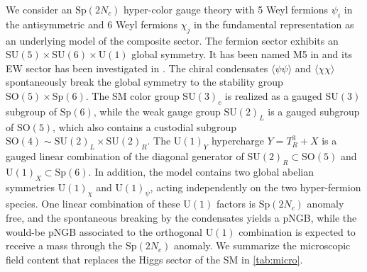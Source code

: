 \documentclass[preprintnumbers,nofootinbib,showpacs,eqsecnum,pre,12pt]{revtex4-1}
\newcommand{\SO}{\text{SO}}
\newcommand{\SU}{\text{SU}}
\newcommand{\U}{\text{U}}
\newcommand{\Sp}{\text{Sp}}
\begin{document}
We consider an $\Sp(2N_c)$ hyper-color gauge theory with 5 Weyl fermions $\psi_i$ in the antisymmetric and 6 Weyl fermions $\chi_j$ in the fundamental representation as an underlying model of the composite sector. The fermion sector exhibits an $\SU(5)\times \SU(6) \times \U(1)$ global symmetry. It has been named M5 in \cite{Belyaev:2016ftv}
and its EW sector has been investigated in \cite{Agugliaro:2018vsu}.
The chiral condensates $\langle \psi\psi \rangle$ and $\langle \chi\chi \rangle$ spontaneously break the global symmetry to the stability group $\SO(5)\times \Sp(6)$. The SM color group $\SU(3)_c$ is realized as a gauged $\SU(3)$ subgroup of $\Sp(6)$, while the weak gauge group $\SU(2)_L$ is a gauged subgroup of $\SO(5)$, which also contains a custodial subgroup $\SO(4) \sim \SU(2)_L \times \SU(2)_R$. The
$\U(1)_Y$ hypercharge $Y = T^3_R + X$ is a gauged linear combination of the diagonal generator of $\SU(2)_R\subset \SO(5)$ and $\U(1)_X\subset \Sp(6)$. In addition, the model
contains two global abelian symmetries $\U(1)_\chi$ and $\U(1)_\psi$, acting independently on the two hyper-fermion species. One linear combination of these $\U(1)$ factors is $\Sp(2N_c)$ anomaly free, and the spontaneous breaking by the condensates yields a pNGB, while the would-be pNGB associated to the orthogonal $\U(1)$ combination is expected to receive a mass through the $\Sp(2N_c)$ anomaly. 
We summarize the microscopic field content that replaces the Higgs sector of the SM in \cref{tab:micro}.
\end{document}
